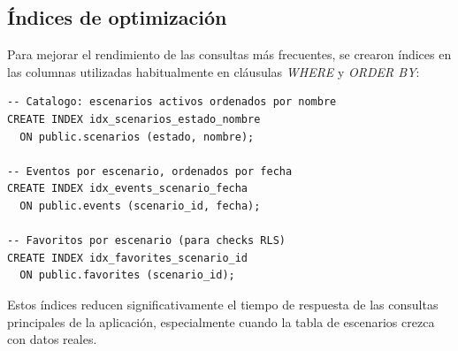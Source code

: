 \begin{table}[H]
  \centering
  \caption{Pol\'iticas RLS por tabla}
\end{table}

\subsection{ \'Indices de optimizaci\'on}

Para mejorar el rendimiento de las consultas m\'as frecuentes, se
crearon \'indices en las columnas utilizadas habitualmente en
cl\'ausulas \textit{WHERE} y \textit{ORDER BY}:

\begin{lstlisting}
-- Catalogo: escenarios activos ordenados por nombre
CREATE INDEX idx_scenarios_estado_nombre
  ON public.scenarios (estado, nombre);

-- Eventos por escenario, ordenados por fecha
CREATE INDEX idx_events_scenario_fecha
  ON public.events (scenario_id, fecha);

-- Favoritos por escenario (para checks RLS)
CREATE INDEX idx_favorites_scenario_id
  ON public.favorites (scenario_id);
\end{lstlisting}

Estos \'indices reducen significativamente el tiempo de respuesta
de las consultas principales de la aplicaci\'on, especialmente
cuando la tabla de escenarios crezca con datos reales.
